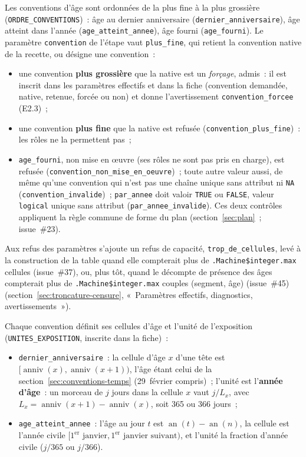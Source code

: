 \documentclass[a4paper,11pt]{article}
\newcommand{\code}[1]{\texttt{\small #1}}
\begin{document}
Les conventions d'âge sont ordonnées de la plus fine à la plus grossière
(\code{ORDRE\_CONVENTIONS})~: âge au dernier anniversaire
(\code{dernier\_anniversaire}), âge atteint dans l'année
(\code{age\_atteint\_annee}), âge fourni (\code{age\_fourni}). Le paramètre
\code{convention} de l'étape vaut \code{plus\_fine}, qui retient la convention
native de la recette, ou désigne une convention~:

\begin{itemize}[leftmargin=*, itemsep=2pt]
  \item une convention \textbf{plus grossière} que la native est un
    \emph{forçage}, admis~: il est inscrit dans les paramètres effectifs et
    dans la fiche (convention demandée, native, retenue, forcée ou non) et
    donne l'avertissement \code{convention\_forcee} (E2.3)~;
  \item une convention \textbf{plus fine} que la native est refusée
    (\code{convention\_plus\_fine})~: les rôles ne la permettent pas~;
  \item \sloppy{} \code{age\_fourni}, non mise en œuvre (ses rôles ne sont pas pris en
    charge), est refusée (\code{convention\_non\_mise\_en\_oeuvre})~; toute
    autre valeur aussi, de même qu'une convention qui n'est pas une chaîne
    unique sans attribut ni \code{NA} (\code{convention\_invalide})~;
    \code{par\_annee} doit valoir \code{TRUE} ou \code{FALSE}, valeur
    \code{logical} unique sans attribut (\code{par\_annee\_invalide}).
    Ces deux contrôles appliquent la règle commune de forme du plan
    (section~\ref{sec:plan}~; issue~\#23).
\end{itemize}

\noindent
Aux refus des paramètres s'ajoute un refus de capacité,
\code{trop\_de\_cellules}, levé à la construction de la table quand elle
compterait plus de \code{.Machine\$integer.max} cellules (issue~\#37), ou,
plus tôt, quand le décompte de présence des âges compterait plus de
\code{.Machine\$integer.max} couples (segment, âge) (issue~\#45)
(section~\ref{sec:troncature-censure}, «~Paramètres effectifs, diagnostics,
avertissements~»).

\noindent
Chaque convention définit ses cellules d'âge et l'unité de l'exposition
(\code{UNITES\_EXPOSITION}, inscrite dans la fiche)~:

\begin{itemize}[leftmargin=*, itemsep=2pt]
  \item \code{dernier\_anniversaire}~: la cellule d'âge $x$ d'une tête est
    $[\operatorname{anniv}(x), \operatorname{anniv}(x+1))$, l'âge étant celui
    de la section~\ref{sec:conventions-temps} (29~février compris)~; l'unité
    est l'\textbf{année d'âge}~: un morceau de $j$ jours dans la cellule $x$
    vaut $j/L_x$, avec $L_x = \operatorname{anniv}(x+1) -
    \operatorname{anniv}(x)$, soit 365 ou 366 jours~;
  \item \sloppy{} \code{age\_atteint\_annee}~: l'âge au jour $t$ est
    $\operatorname{an}(t) - \operatorname{an}(n)$, la cellule est l'année
    civile $[1^{\text{er}}\text{ janvier}, 1^{\text{er}}\text{ janvier
    suivant})$, et l'unité la fraction d'année civile ($j/365$ ou $j/366$).
\end{itemize}
\end{document}
